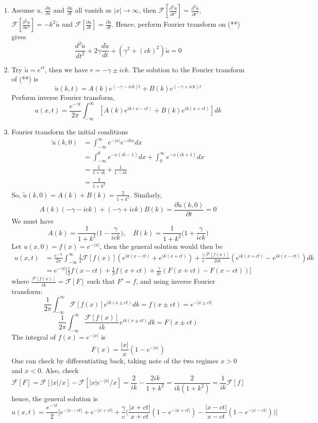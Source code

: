 \documentclass[a4paper]{article}
\begin{document}
\begin{ans}\leavevmode
\begin{enumerate}[label=(\roman*)]
\item Assume $u$, $\frac{\partial u}{\partial x}$ and $\frac{\partial u}{\partial t}$ all vanish as $|x|\rightarrow\infty$, then $\mathcal{F}[\frac{\partial^2u}{\partial t^2}]=\frac{\partial^2\tilde{u}}{\partial t^2}$, $\mathcal{F}[\frac{\partial^2u}{\partial x^2}]=-k^2\tilde{u}$ and $\mathcal{F}[\frac{\partial u}{\partial t}]=\frac{\partial\tilde{u}}{\partial t}$. Hence, perform Fourier transform on (**) gives
$$\frac{d^2\tilde{u}}{dt^2}+2\gamma\frac{d\tilde{u}}{dt}+(\gamma^2+(ck)^2)\tilde{u}=0$$
\item Try $\tilde{u}=e^{rt}$, then we have $r=-\gamma\pm ick$. The solution to the Fourier transform of (**) is
$$\tilde{u}(k,t)=A(k)e^{(-\gamma-ick)t}+B(k)e^{(-\gamma+ick)t}$$
Perform inverse Fourier transform,
$$u(x,t)=\frac{e^{-\gamma t}}{2\pi}\int_{-\infty}^\infty[A(k)e^{ik(x-ct)}+B(k)e^{ik(x+ct)}]dk$$
\item Fourier transform the initial conditions
\begin{align}
\tilde{u}(k,0)&=\int_{-\infty}^\infty e^{-|x|}e^{-ikx}dx\nonumber\\&=\int_{-\infty}^0e^{-x(ik-1)}dx+\int_0^\infty e^{-x(ik+1)}dx\nonumber\\&=\frac{1}{1+ik}+\frac{1}{1-ik}\nonumber\\&=\frac{2}{1+k^2}\nonumber
\end{align}
So, $\tilde{u}(k,0)=A(k)+B(k)=\frac{2}{1+k^2}$. Similarly, 
$$A(k)(-\gamma-ick)+(-\gamma+ick)B(k)=\frac{\partial\tilde{u}(k,0)}{\partial t}=0$$
We must have 
$$A(k)=\frac{1}{1+k^2}\bigg(1-\frac{\gamma}{ick}\bigg),\quad B(k)=\frac{1}{1+k^2}\bigg(1+\frac{\gamma}{ick}\bigg)$$
Let $u(x,0)=f(x)=e^{-|x|}$, then the general solution would then be
\begin{align}
u(x,t)&=\frac{e^{-\gamma t}}{2\pi}\int_{-\infty}^\infty\frac{1}{2}\mathcal{F}[f(x)](e^{ik(x-ct)}+e^{ik(x+ct)})+\frac{\gamma}{c}\frac{\mathcal{F}[f(x)]}{2ik}(e^{ik(x+ct)}-e^{ik(x-ct)})dk\nonumber\\&=e^{-\gamma t}\bigg[\frac{1}{2}f(x-ct)+\frac{1}{2}f(x+ct)+\frac{\gamma}{2c}(F(x+ct)-F(x-ct))\bigg]\nonumber
\end{align}
where $\frac{\mathcal{F}[f(x)]}{ik}=\mathcal{F}[F]$ such that $F'=f$, and using inverse Fourier transform:
$$\frac{1}{2\pi}\int_{-\infty}^\infty\mathcal{F}[f(x)]e^{ik(x\pm ct)}dk=f(x\pm ct)=e^{-|x\pm ct|}$$
$$\frac{1}{2\pi}\int_{-\infty}^\infty\frac{\mathcal{F}[f(x)]}{ik}e^{ik(x\pm ct)}dk=F(x\pm ct)$$
The integral of $f(x)=e^{-|x|}$ is
$$F(x)=\frac{|x|}{x}(1-e^{-|x|})$$
One can check by differentiating back, taking note of the two regimes $x>0$ and $x<0$. Also, check 
$$\mathcal{F}[F]=\mathcal{F}[|x|/x]-\mathcal{F}[|x|e^{-|x|}/x]=\frac{2}{ik}-\frac{2ik}{1+k^2}=\frac{2}{ik(1+k^2)}=\frac{1}{ik}\mathcal{F}[f]$$
hence, the general solution is
$$u(x,t)=\frac{e^{-\gamma t}}{2}\bigg[e^{-|x-ct|}+e^{-|x+ct|}+\frac{\gamma}{c}\bigg(\frac{|x+ct|}{x+ct}(1-e^{-|x+ct|})-\frac{|x-ct|}{x-ct}(1-e^{-|x-ct|})\bigg)\bigg]$$
\end{enumerate}
\end{ans}
\end{document}
